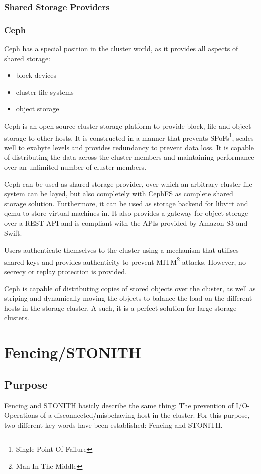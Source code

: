 \subsubsection{Shared Storage Providers}
\subsubsection{Ceph}
Ceph has a special position in the cluster world, as it provides all aspects of shared storage:
\begin{itemize}
\item block devices
\item cluster file systems
\item object storage
\end{itemize}

Ceph is an open source cluster storage platform to provide block, file and object storage to other hosts. It is constructed in a manner that prevents SPoFs\footnote{Single Point Of Failure}, scales well to exabyte levels and provides redundancy to prevent data loss. It is capable of distributing the data across the cluster members and maintaining performance over an unlimited number of cluster members.

Ceph can be used as shared storage provider, over which an arbitrary cluster file system can be layed, but also completely with CephFS as complete shared storage solution. Furthermore, it can be used as storage backend for libvirt and qemu to store virtual machines in. It also provides a gateway for object storage over a REST API and is compliant with the APIs provided by Amazon S3 and Swift.%

Users authenticate themselves to the cluster using a mechanism that utilises shared keys and provides authenticity to prevent MITM\footnote{Man In The Middle} attacks. However, no secrecy or replay protection is provided\cite{ceph_architecture}.

Ceph is capable of distributing copies of stored objects over the cluster, as well as striping and dynamically moving the objects to balance the load on the different hosts in the storage cluster. A such, it is a perfect solution for large storage clusters.



\section{Fencing/STONITH}
\subsection{Purpose}
Fencing and STONITH basicly describe the same thing: The prevention of I/O-Operations of a disconnected/misbehaving host in the cluster.
For this purpose, two different key words have been established: Fencing and \ac{STONITH}.
